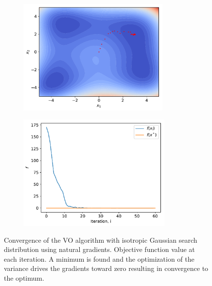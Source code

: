 \begin{figure}[tbp!]
    \begin{subfigure}[b]{0.49\textwidth}
        \centering
        \includegraphics[height=5.8cm]{graphics/var-opt-conv/VO-N-himmelblau-convergence.pdf}
        \caption{}
        \label{fig: Theory: var-opt-conv-VO-N-himmelblau-convergence}
    \end{subfigure}
    \hfill
    \begin{subfigure}[b]{0.49\textwidth}
        \centering
        \includegraphics[height=5.8cm]{graphics/var-opt-conv/VO-N-himmelblau-f.pdf}
        \caption{}
        \label{fig: Theory: var-opt-conv-VO-N-himmelblau-f}
    \end{subfigure}
    \caption{ Convergence of the \gls{VO} algorithm with isotropic Gaussian search distribution using natural gradients.  Objective function value at each iteration. A minimum is found and the optimization of the variance drives the gradients toward zero resulting in convergence to the optimum.}
    \label{fig: Theory: var-opt-conv-VO-N-himmelblau}
\end{figure}